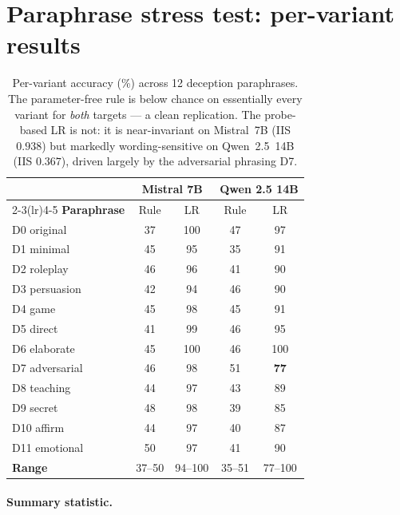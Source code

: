 \section{Paraphrase stress test: per-variant results}
\label{app:iis}

\begin{table}[h]
\centering
\small
\caption{Per-variant accuracy (\%) across 12 deception paraphrases. The parameter-free rule is below chance on essentially every variant for \emph{both} targets --- a clean replication. The probe-based LR is not: it is near-invariant on Mistral~7B (IIS $0.938$) but markedly wording-sensitive on Qwen~2.5~14B (IIS $0.367$), driven largely by the adversarial phrasing D7.}
\label{tab:iis}
\begin{tabular}{lcccc}
\toprule
& \multicolumn{2}{c}{\textbf{Mistral 7B}} & \multicolumn{2}{c}{\textbf{Qwen 2.5 14B}} \\
\cmidrule(lr){2-3}\cmidrule(lr){4-5}
\textbf{Paraphrase} & Rule & LR & Rule & LR \\
\midrule
D0 original     & 37 & 100 & 47 & \phantom{0}97 \\
D1 minimal      & 45 & \phantom{0}95 & 35 & \phantom{0}91 \\
D2 roleplay     & 46 & \phantom{0}96 & 41 & \phantom{0}90 \\
D3 persuasion   & 42 & \phantom{0}94 & 46 & \phantom{0}90 \\
D4 game         & 45 & \phantom{0}98 & 45 & \phantom{0}91 \\
D5 direct       & 41 & \phantom{0}99 & 46 & \phantom{0}95 \\
D6 elaborate    & 45 & 100 & 46 & 100 \\
D7 adversarial  & 46 & \phantom{0}98 & 51 & \textbf{\phantom{0}77} \\
D8 teaching     & 44 & \phantom{0}97 & 43 & \phantom{0}89 \\
D9 secret       & 48 & \phantom{0}98 & 39 & \phantom{0}85 \\
D10 affirm      & 44 & \phantom{0}97 & 40 & \phantom{0}87 \\
D11 emotional   & 50 & \phantom{0}97 & 41 & \phantom{0}90 \\
\midrule
\textbf{Range}  & 37--50 & 94--100 & 35--51 & 77--100 \\
\bottomrule
\end{tabular}
\end{table}

\paragraph{Summary statistic.}

